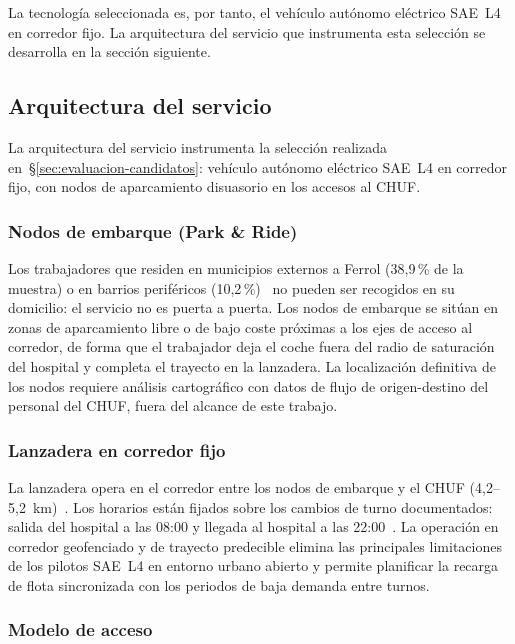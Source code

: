 La tecnología seleccionada es, por tanto, el vehículo autónomo
eléctrico SAE~L4 en corredor fijo. La arquitectura del servicio
que instrumenta esta selección se desarrolla en la sección
siguiente.

\subsection{Arquitectura del servicio}
\label{sec:arquitectura-pr}

La arquitectura del servicio instrumenta la selección realizada
en~§\ref{sec:evaluacion-candidatos}: vehículo autónomo eléctrico
SAE~L4 en corredor fijo, con nodos de aparcamiento disuasorio
en los accesos al \acs{CHUF}.

\subsubsection{Nodos de embarque (Park \& Ride)}

Los trabajadores que residen en municipios externos a Ferrol
(38,9\,\% de la muestra) o en barrios periféricos
(10,2\,\%)~\parencite{LouridoRegueira2026} no pueden ser
recogidos en su domicilio: el servicio no es puerta a puerta.
Los nodos de embarque se sitúan en zonas de aparcamiento libre
o de bajo coste próximas a los ejes de acceso al corredor, de
forma que el trabajador deja el coche fuera del radio de
saturación del hospital y completa el trayecto en la lanzadera.
La localización definitiva de los nodos requiere análisis
cartográfico con datos de flujo de origen-destino del personal
del \acs{CHUF}, fuera del alcance de este trabajo.

\subsubsection{Lanzadera en corredor fijo}

La lanzadera opera en el corredor entre los nodos de embarque
y el \acs{CHUF} (4,2--5,2~km)~\parencite{SERGASFerrol2025}.
Los horarios están fijados sobre los cambios de turno
documentados: salida del hospital a las 08:00 y llegada al
hospital a las 22:00~\parencite{XuntaGalicia2025dog}. La
operación en corredor geofenciado y de trayecto predecible
elimina las principales limitaciones de los pilotos SAE~L4 en
entorno urbano abierto y permite planificar la recarga de flota
sincronizada con los periodos de baja demanda entre turnos.

\subsubsection{Modelo de acceso}

